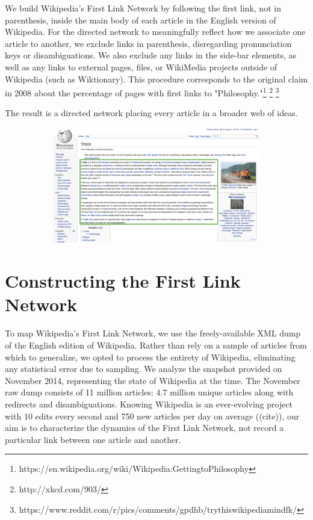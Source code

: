 \documentclass[twoside]{article}
\begin{document}
We build Wikipedia's First Link Network by following the first link, not in parenthesis, inside the main body of each article in the English version of Wikipedia. 
For the directed network to meaningfully reflect how we associate one article to another, we exclude links in parenthesis, 
disregarding pronunciation keys or disambiguations.
We also exclude any links in the side-bar elements, as well as any links to external pages, files, or WikiMedia 
projects outside of Wikipedia (such as Wiktionary).
This procedure corresponds to the original claim in 2008 about the percentage of pages with first links to 
"Philosophy."\footnote{
https://en.wikipedia.org/wiki/Wikipedia:GettingtoPhilosophy
}
\footnote{
http://xkcd.com/903/
}
\footnote{
https://www.reddit.com/r/pics/comments/gpdhb/trythiswikipediamindfk/
}

The result is a directed network placing every article in a broader web of ideas.


\begin{figure}[H]
\centering
\caption{Wikipedia Train}
    \begin{subfigure}[b]{0.8\textwidth}
        \includegraphics[width=\textwidth]{graphics/wiki_train.png}    
    \end{subfigure}
\end{figure}
\section{Constructing the First Link Network}

To map Wikipedia's First Link Network, we use the freely-available XML dump of the English edition of Wikipedia. 
Rather than rely on a sample of articles from which to generalize, we opted to process the entirety of Wikipedia, 
eliminating any statistical error due to sampling.
We analyze the snapshot provided on November 2014, representing the state of Wikipedia at the time.
The November raw dump consists of 11 million articles: 4.7 million unique articles along with redirects
and disambiguations.
Knowing Wikipedia is an ever-evolving project with 10 edits every second and 750 new articles per day on average
((cite)), our aim is to characterize the dynamics of the First Link Network, not record a particular link between one
article and another.
\end{document}
